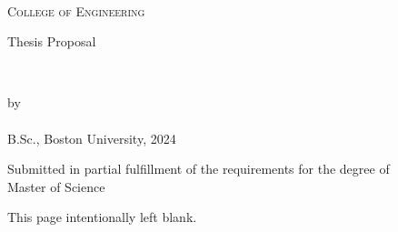 
\begin{titlepage}
    \begin{center}
        \begin{doublespace}
             \\
            \textsc{\Large College of Engineering} \\
        \end{doublespace}
        \vfill
        {\large Thesis Proposal}\\
        \vfill
        \begin{spacing}{1.5}
            \textbf{\textsc{\huge\thesisName}} \\
        \end{spacing}
        \vfill
        by \\
        \vfill
        \textbf{\LARGE\authorName} \\ \vspace{2.5pt}
        {\Large B.Sc., Boston University, 2024} \\
        \vfill
        \begin{doublespace}
            Submitted in partial fulfillment of the requirements for the degree of\\
            Master of Science\\
            \the\year
        \end{doublespace}
    \end{center}
\end{titlepage}

\newpage
\pagestyle{empty}
    \begin{center}
        This page intentionally left blank.
    \end{center}
    \cleardoublepage
\pagestyle{plain}

\setcounter{page}{1}
    \tableofcontents
\cleardoublepage

\setcounter{page}{1}
